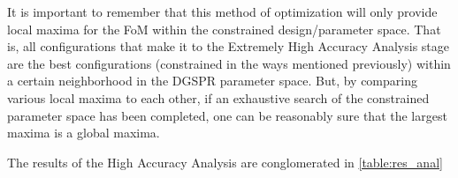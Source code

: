 It is important to remember that this method of optimization will only provide local maxima for the FoM within the constrained design/parameter space. That is, all configurations that make it to the Extremely High Accuracy Analysis stage are the best configurations (constrained in the ways mentioned previously) within a certain neighborhood in the DGSPR parameter space. But, by comparing various local maxima to each other, if an exhaustive search of the constrained parameter space has been completed, one can be reasonably sure that the largest maxima is a global maxima.

The results of the High Accuracy Analysis are conglomerated in \autoref{table:res_anal} 

\begin{table}[h]
\centering
{}
\caption{Table showing the results of the High Accuracy Analysis i.e. the best possible configurations of the sensor for manufacturing}
\label{table:res_anal}
\end{table}

